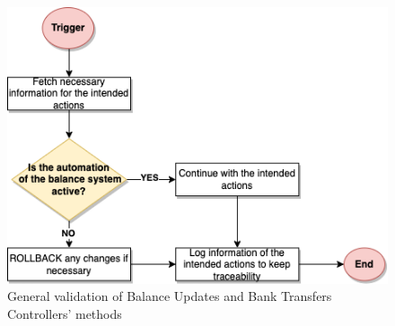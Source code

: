 \begin{figure} [H]
    \centering
    \includegraphics[scale = 0.5]{assets/diagrams/Validation.png}
    \caption{General validation of Balance Updates and Bank Transfers Controllers' methods}\label{fig:automation_validation}
\end{figure}
